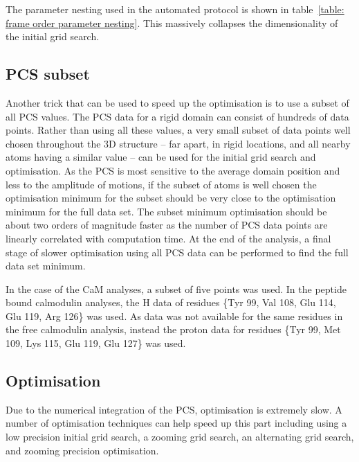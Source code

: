 

The parameter nesting used in the automated protocol is shown in table~\ref{table: frame order parameter nesting}.
This massively collapses the dimensionality of the initial grid search.





\subsection{PCS subset}

Another trick that can be used to speed up the optimisation is to use a subset of all PCS values.
The PCS data for a rigid domain can consist of hundreds of data points.
Rather than using all these values, a very small subset of data points well chosen throughout the 3D structure -- far apart, in rigid locations, and all nearby atoms having a similar value -- can be used for the initial grid search and optimisation.
As the PCS is most sensitive to the average domain position and less to the amplitude of motions, if the subset of atoms is well chosen the optimisation minimum for the subset should be very close to the optimisation minimum for the full data set.
The subset minimum optimisation should be about two orders of magnitude faster as the number of PCS data points are linearly correlated with computation time.
At the end of the analysis, a final stage of slower optimisation using all PCS data can be performed to find the full data set minimum.

In the case of the CaM analyses, a subset of five points was used.
In the peptide bound calmodulin analyses, the H data of residues \{Tyr 99, Val 108, Glu 114, Glu 119, Arg 126\} was used.
As data was not available for the same residues in the free calmodulin analysis, instead the proton data for residues \{Tyr 99, Met 109, Lys 115, Glu 119, Glu 127\} was used.





\subsection{Optimisation}

Due to the numerical integration of the PCS, optimisation is extremely slow.
A number of optimisation techniques can help speed up this part including using a low precision initial grid search, a zooming grid search, an alternating grid search, and zooming precision optimisation.




